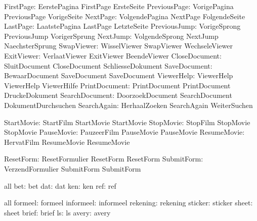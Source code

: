          FirstPage:  EerstePagina      FirstPage            ErsteSeite
      PreviousPage:  VorigePagina      PreviousPage         VorigeSeite
          NextPage:  VolgendePagina    NextPage             FolgendeSeite
          LastPage:  LaatstePagina     LastPage             LetzteSeite
      PreviousJump:  VorigeSprong      PreviousJump         VorigerSprung
          NextJump:  VolgendeSprong    NextJump             NaechsterSprung
        SwapViewer:  WisselViewer      SwapViewer           WechseleViewer
        ExitViewer:  VerlaatViewer     ExitViewer           BeendeViewer
     CloseDocument:  SluitDocument     CloseDocument        SchliesseDokument
      SaveDocument:  BewaarDocument    SaveDocument         SaveDocument %
        ViewerHelp:  ViewerHelp        ViewerHelp           ViewerHilfe
     PrintDocument:  PrintDocument     PrintDocument        DruckeDokument
    SearchDocument:  DoorzoekDocument  SearchDocument       DokumentDurchsuchen
       SearchAgain:  HerhaalZoeken     SearchAgain          WeiterSuchen

        StartMovie:  StartFilm         StartMovie           StartMovie
         StopMovie:  StopFilm          StopMovie            StopMovie
        PauseMovie:  PauzeerFilm       PauseMovie           PauseMovie
       ResumeMovie:  HervatFilm        ResumeMovie          ResumeMovie

         ResetForm:  ResetFormulier    ResetForm            ResetForm   %
        SubmitForm:  VerzendFormulier  SubmitForm           SubmitForm  %

\stopvariables




\startconstants       all
                bet:  bet
                dat:  dat
                ken:  ken
                ref:  ref
\stopconstants

\startvariables       all
            formeel:  formeel
          informeel:  informeel
           rekening:  rekening
            sticker:  sticker
              sheet:  sheet
              brief:  brief
                 ls:  ls
              avery:  avery
\stopvariables


\endinput

